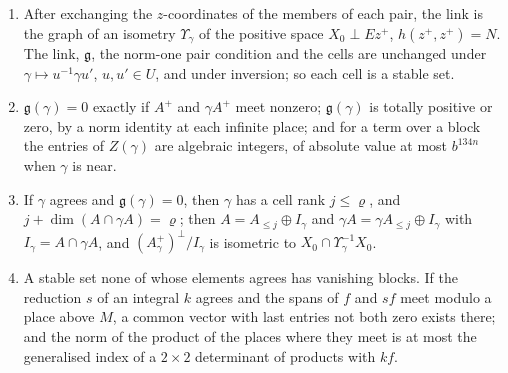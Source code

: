 \begin{proposition}\label{prop:links}
\begin{enumerate}[label=\textup{(\alph*)}]
\item After exchanging the $z$-coordinates of the members of each pair, the link is the graph of an isometry $\Upsilon_\gamma$ of the positive space $X_0\perp Ez^+$, $h(z^+,z^+)=N$. The link,
$\mathfrak g$, the norm-one pair condition and the cells are unchanged under $\gamma\mapsto u^{-1}\gamma u'$, $u,u'\in U$, and under inversion; so each cell is a stable set.
\item $\mathfrak g(\gamma)=0$ exactly if $A^+$ and $\gamma A^+$ meet nonzero; $\mathfrak g(\gamma)$ is totally positive or zero, by a norm identity at each infinite place; and for a term over a block the
entries of $Z(\gamma)$ are algebraic integers, of absolute value at most $b^{134n}$ when $\gamma$ is near.
\item If $\gamma$ agrees and $\mathfrak g(\gamma)=0$, then $\gamma$ has a cell rank $j\le\varrho$, and $j+\dim(A\cap\gamma A)=\varrho$; then $A=A_{\le j}\oplus I_\gamma$ and $\gamma A=\gamma A_{\le j}\oplus I_\gamma$ with
$I_\gamma=A\cap\gamma A$, and $(A^+_\gamma)^\perp/I_\gamma$ is isometric to $X_0\cap\Upsilon_\gamma^{-1}X_0$.
\item A stable set none of whose elements agrees has vanishing blocks. If the reduction $s$ of an integral $k$ agrees and the spans of $f$ and $sf$ meet modulo a place above $M$, a common vector
with last entries not both zero exists there; and the norm of the product of the places where they meet is at most the generalised index of a $2\times2$ determinant of products
with $k f$.
\end{enumerate}
\end{proposition}
